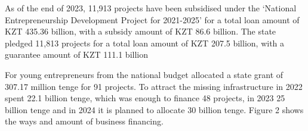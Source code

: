 
As of the end of 2023, 11,913 projects have been subsidised under the
`National Entrepreneurship Development Project for 2021-2025' for a
total loan amount of KZT 435.36 billion, with a subsidy amount of KZT
86.6 billion. The state pledged 11,813 projects for a total loan amount
of KZT 207.5 billion, with a guarantee amount of KZT 111.1 billion

For young entrepreneurs from the national budget allocated a state grant
of 307.17 million tenge for 91 projects. To attract the missing
infrastructure in 2022 spent 22.1 billion tenge, which was enough to
finance 48 projects, in 2023 25 billion tenge and in 2024 it is planned
to allocate 30 billion tenge. Figure 2 shows the ways and amount of
business financing.

